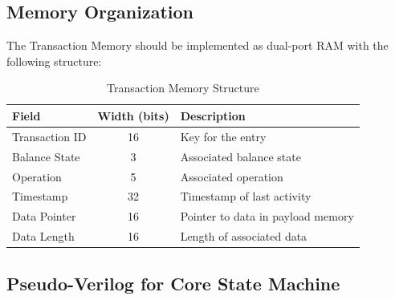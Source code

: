 \documentclass[../OAE-SPEC-MAIN.tex]{subfiles}
\begin{document}
\subsection{Memory Organization}

The Transaction Memory should be implemented as dual-port RAM with the following structure:

\begin{table}[h]
\centering
\begin{tabular}{|l|c|l|}
\hline
\textbf{Field} & \textbf{Width (bits)} & \textbf{Description} \\
\hline
Transaction ID & 16 & Key for the entry \\
Balance State & 3 & Associated balance state \\
Operation & 5 & Associated operation \\
Timestamp & 32 & Timestamp of last activity \\
Data Pointer & 16 & Pointer to data in payload memory \\
Data Length & 16 & Length of associated data \\
\hline
\end{tabular}
\caption{Transaction Memory Structure}
\end{table}

\subsection{Pseudo-Verilog for Core State Machine}
\end{document}
